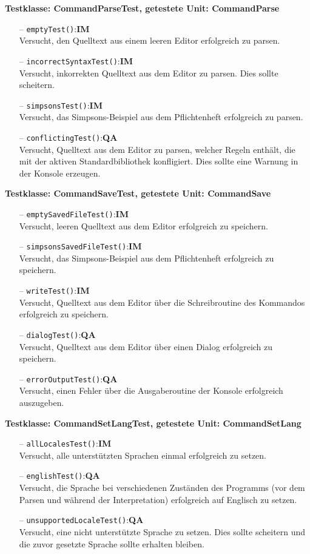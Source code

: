 \documentclass[parskip=full,11pt,twoside]{scrartcl}
\def\qa{\hfill\textbf{QA}}
\def\impl{\hfill\textbf{IM}}
\begin{document}
\textbf{Testklasse: CommandParseTest, getestete Unit: CommandParse}
\begin{itemize}
	\item[--] \texttt{emptyTest()}:\impl\\
	Versucht, den Quelltext aus einem leeren Editor erfolgreich zu parsen.
	\item[--] \texttt{incorrectSyntaxTest()}:\impl\\
	Versucht, inkorrekten Quelltext aus dem Editor zu parsen. Dies sollte scheitern.
	\item[--] \texttt{simpsonsTest()}:\impl\\
	Versucht, das Simpsons-Beispiel aus dem Pflichtenheft erfolgreich zu parsen.
	\item[--] \texttt{conflictingTest()}:\qa\\
	Versucht, Quelltext aus dem Editor zu parsen, welcher Regeln enthält, die mit der aktiven Standardbibliothek konfligiert. Dies sollte eine Warnung in der Konsole erzeugen.
\end{itemize}

\textbf{Testklasse: CommandSaveTest, getestete Unit: CommandSave}
\begin{itemize}
	\item[--] \texttt{emptySavedFileTest()}:\impl\\
	Versucht, leeren Quelltext aus dem Editor erfolgreich zu speichern.
	\item[--] \texttt{simpsonsSavedFileTest()}:\impl\\
	Versucht, das Simpsons-Beispiel aus dem Pflichtenheft erfolgreich zu speichern.
	\item[--] \texttt{writeTest()}:\impl\\
	Versucht, Quelltext aus dem Editor über die Schreibroutine des Kommandos erfolgreich zu speichern.
	\item[--] \texttt{dialogTest()}:\qa\\
	Versucht, Quelltext aus dem Editor über einen Dialog erfolgreich zu speichern.
	\item[--] \texttt{errorOutputTest()}:\qa\\
	Versucht, einen Fehler über die Ausgaberoutine der Konsole erfolgreich auszugeben.	
\end{itemize}

\textbf{Testklasse: CommandSetLangTest, getestete Unit: CommandSetLang}
\begin{itemize}
	\item[--] \texttt{allLocalesTest()}:\impl\\
	Versucht, alle unterstützten Sprachen einmal erfolgreich zu setzen.
	\item[--] \texttt{englishTest()}:\qa\\
	Versucht, die Sprache bei verschiedenen Zuständen des Programms (vor dem Parsen und während der Interpretation) erfolgreich auf Englisch zu setzen.
	\item[--] \texttt{unsupportedLocaleTest()}:\qa\\
	Versucht, eine nicht unterstützte Sprache zu setzen. Dies sollte scheitern und die zuvor gesetzte Sprache sollte erhalten bleiben.
\end{itemize}
\end{document}
